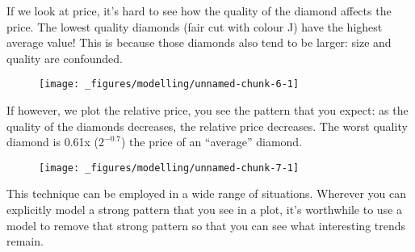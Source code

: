 If we look at price, it's hard to see how the quality of the diamond
affects the price. The lowest quality diamonds (fair cut with colour J)
have the highest average value! This is because those diamonds also tend
to be larger: size and quality are confounded.

\begin{Shaded}
\begin{Highlighting}[]
\StringTok{ }
\StringTok{  }\NormalTok{(}\NormalTok{(}  \NormalTok{) +}
\StringTok{  }\NormalTok{(}\NormalTok{(} 
\end{Highlighting}
\end{Shaded}

\begin{figure}[H]
  \centering
  \texttt{[image: \_figures/modelling/unnamed-chunk-6-1]}
\end{figure}

If however, we plot the relative price, you see the pattern that you
expect: as the quality of the diamonds decreases, the relative price
decreases. The worst quality diamond is 0.61x (\(2 ^ {-0.7}\)) the price
of an ``average'' diamond.

\begin{Shaded}
\begin{Highlighting}[]
\StringTok{ }
\StringTok{  }\NormalTok{(}\NormalTok{(}  \NormalTok{) +}
\StringTok{  }\NormalTok{(}\NormalTok{(} 
\end{Highlighting}
\end{Shaded}

\begin{figure}[H]
  \centering
  \texttt{[image: \_figures/modelling/unnamed-chunk-7-1]}
\end{figure}

This technique can be employed in a wide range of situations. Wherever
you can explicitly model a strong pattern that you see in a plot, it's
worthwhile to use a model to remove that strong pattern so that you can
see what interesting trends remain.

